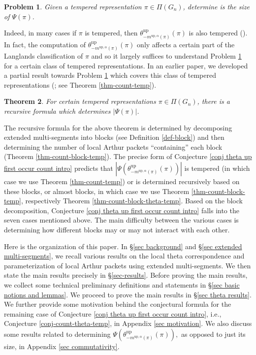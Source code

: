 \documentclass[11pt,letterpaper]{amsart}
\newcommand{\up}{{\mathrm{up}}}
\newtheorem{thm}{Theorem}[section]
\newtheorem{prob}[thm]{Problem}
\numberwithin{equation}{section}
\begin{document}
\begin{prob}\label{prob temp count intro}
    Given a tempered representation $\pi\in\Pi(G_n)$, determine is the size of $\Psi(\pi)$.
\end{prob}
Indeed, in many cases if $\pi$ is tempered, then $\theta_{-m^{\up, \alpha}(\pi)}^\up(\pi)$ is also tempered (\cite[Theorem 4.1]{AG17a}). In fact, the computation of $\theta_{-m^{\up, \alpha}(\pi)}^\up(\pi)$ only affects a certain part of the Langlands classification of $\pi$ and so it largely suffices to understand Problem \ref{prob temp count intro} for a certain class of tempered representations. 
In an earlier paper, we developed a partial result towards Problem \ref{prob temp count intro} which covers this class of tempered representations (\cite[Theorem 3.7]{HKT26}; see Theorem \ref{thm-count-temp}). 

\begin{thm}\label{thm tempered count intro}
For certain tempered representations $\pi\in\Pi(G_n)$, there is a recursive formula which determines $|\Psi(\pi)|$.
\end{thm}

The recursive formula for the above theorem is determined by decomposing extended multi-segments into blocks (see Definition \ref{def-block}) and then determining the number of local Arthur packets ``containing'' each block (Theorem \ref{thm-count-block-temp}).
The precise form of Conjecture \ref{conj theta up first occur count intro} predicts that $|\Psi(\theta_{-m^{\up, \alpha}(\pi)}^\up(\pi))|$ is tempered (in which case we use Theorem \ref{thm-count-temp}) or is determined recursively based on these blocks, or almost blocks, in which case we use Theorem \ref{thm-count-block-temp}, respectively Theorem \ref{thm-count-block-theta-temp}. Based on the block decomposition,  Conjecture \ref{conj theta up first occur count intro} falls into the seven cases mentioned above. 
The main difficulty between the various cases is determining how different blocks may or may not interact with each other.


Here is the organization of this paper.  
In \S\ref{sec background} and \S\ref{sec extended multi-segments}, we recall various results on the local theta correspondence and parameterization of local Arthur packets using extended multi-segments. 
We then state the main results precisely in \S\ref{sec-results}. 
Before proving the main results, we collect some technical preliminary definitions and statements in \S\ref{sec basic notions and lemmas}. 
We proceed to prove the main results in \S\ref{sec theta results}. 
We further provide some motivation behind the conjectural formula for the remaining case of Conjecture \ref{conj theta up first occur count intro}, i.e., Conjecture \ref{conj-count-theta-temp}, in Appendix \ref{sec motivation}. We also discuss some results related to determining $\Psi(\theta_{-m^{\up, \alpha}(\pi)}^\up(\pi)),$ as opposed to just its size, in Appendix \ref{sec commutativity}.
\end{document}
